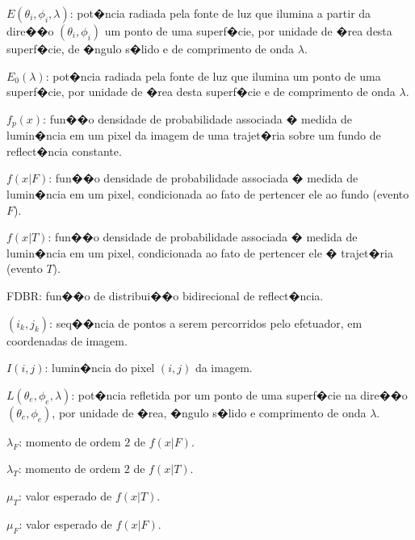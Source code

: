 {}

\newcommand{\acrlista}[1]{\vspace{12pt}\noindent #1}

\acrlista{$E(\theta_i,\phi_i,\lambda)$: pot�ncia radiada pela fonte de luz que ilumina a partir da dire��o $(\theta_i,\phi_i)$ um ponto de uma superf�cie, por unidade de �rea desta superf�cie, de �ngulo s�lido e de comprimento de onda $\lambda$.}

\acrlista{$E_0(\lambda)$: pot�ncia radiada pela fonte de luz que ilumina um ponto de uma superf�cie, por unidade de �rea desta superf�cie e de comprimento de onda $\lambda$.}

\acrlista{$f_p(x)$: fun��o densidade de probabilidade associada � medida de lumin�ncia em um pixel{ }da imagem de uma trajet�ria sobre um fundo de reflect�ncia constante.}

\acrlista{$f(x|F)$: fun��o densidade de probabilidade associada � medida de lumin�ncia em um pixel, condicionada ao fato de pertencer ele ao fundo (evento $F$).}

\acrlista{$f(x|T)$: fun��o densidade de probabilidade associada � medida de lumin�ncia em um pixel, condicionada ao fato de pertencer ele � trajet�ria (evento $T$).}

\acrlista{FDBR: fun��o de distribui��o bidirecional de reflect�ncia.}

\acrlista{$(i_k,j_k)$: seq��ncia de pontos a serem percorridos pelo efetuador, em coordenadas de imagem.}

\acrlista{$I(i,j)$: lumin�ncia do pixel{ }$(i,j)$ da imagem.}

\acrlista{$L(\theta_e,\phi_e,\lambda)$: pot�ncia refletida por um ponto de uma superf�cie na dire��o $(\theta_e,\phi_e)$, por unidade de �rea, �ngulo s�lido e comprimento de onda $\lambda$.}

\acrlista{$\lambda_F$: momento de ordem $2$ de $f(x|F)$.}

\acrlista{$\lambda_T$: momento de ordem $2$ de $f(x|T)$.}

\acrlista{$\mu_T$: valor esperado de $f(x|T)$.}

\acrlista{$\mu_F$: valor esperado de $f(x|F)$.}

